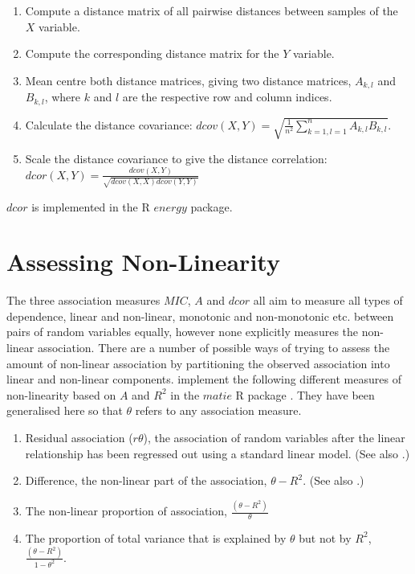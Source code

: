 \documentclass[a4paper, 12pt]{report}
\begin{document}
\begin{enumerate}
\item Compute a distance matrix of all pairwise distances between samples of the $X$ variable.
\item Compute the corresponding distance matrix for the $Y$ variable.
\item Mean centre both distance matrices, giving two distance matrices, $A_{k,l}$ and $B_{k,l}$, where $k$ and $l$ are the respective row and column indices.
\item Calculate the distance covariance: $dcov(X,Y) = \sqrt{\frac{1}{n^2} \sum^n_{k=1,l=1}A_{k,l}B_{k,l}}$.
\item Scale the distance covariance to give the distance correlation: \newline
$dcor(X,Y) = \frac{dcov(X,Y)}{\sqrt{dcov(X,X)dcov(Y,Y)}}$
\end{enumerate}

$dcor$ is implemented in the R $energy$ \cite{energy} package.  

\section{Assessing Non-Linearity}

The three association measures $MIC$, $A$ and $dcor$ all aim to measure all types of dependence, linear and non-linear, monotonic and non-monotonic etc. between pairs of random variables equally, however none explicitly measures the non-linear association. 
There are a number of possible ways of trying to assess the amount of non-linear association by partitioning the observed association into linear and non-linear components. \citet{Murrel:2013:Online} implement the following different measures of non-linearity based on $A$ and $R^2$ in the $matie$ R package \cite{matie}. They have been generalised here so that $\theta$ refers to any association measure.

\begin{enumerate}
\item Residual association ($r \theta$), the association of random variables after the linear relationship has been regressed out using a standard linear model. (See also \citet{energy2013}.) %
\item Difference, the non-linear part of the association, $\theta - R^2$. (See also \citet{mic2011}.)
\item The non-linear proportion of association, $\frac{(\theta-R^2)}{\theta}$
\item The proportion of total variance that is explained by $\theta$ but not by $R^2$, $\frac{(\theta-R^2)}{1 -\theta^2}$.
\end{enumerate}
\end{document}
